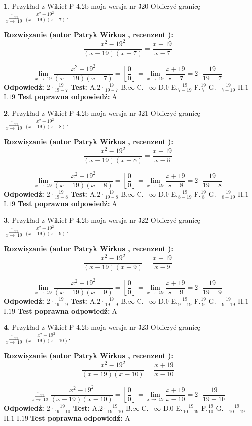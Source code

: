 \documentclass[12pt, a4paper]{article}
\theoremstyle{definition} %
\newtheorem{zad}{}
\newcommand{\zadStart}[1]{\begin{zad}#1\newline}
\newcommand{\zadStop}{\end{zad}}
\newcommand{\rozwStart}[2]{\noindent \textbf{Rozwiązanie (autor #1 , recenzent #2): }\newline}
\newcommand{\rozwStop}{\newline}
\newcommand{\odpStart}{\noindent \textbf{Odpowiedź:}\newline}
\newcommand{\odpStop}{\newline}
\newcommand{\testStart}{\noindent \textbf{Test:}\newline}
\newcommand{\testStop}{\newline}
\newcommand{\kluczStart}{\noindent \textbf{Test poprawna odpowiedź:}\newline}
\newcommand{\kluczStop}{\newline}
\begin{document}
\zadStart{Przykład z Wikieł P 4.2b moja wersja nr 320}
Obliczyć granicę $\lim\limits_{x\to\ 19}\frac{x^{2}-19^{2}}{(x-19)(x-7)}$.
\zadStop
\rozwStart{Patryk Wirkus}{}
$$\frac{x^{2}-19^{2}}{(x-19)(x-7)}=\frac{x+19}{x-7}$$

$$\lim\limits_{x\to\ 19}\frac{x^{2}-19^{2}}{(x-19)(x-7)}=[\frac{0}{0}]=\lim\limits_{x\to\ 19}\frac{x+19}{x-7}=2 \cdot \frac{19}{19-7}$$
\rozwStop
\odpStart
$2 \cdot \frac{19}{19-7}$
\odpStop
\testStart
A.$2 \cdot \frac{19}{19-7}$
B.$\infty$
C.$-\infty$
D.$0$
E.$\frac{19}{7-19}$
F.$\frac{19}{7}$
G.$-\frac{19}{7-19}$
H.$1$
I.$19$
\testStop
\kluczStart
A
\kluczStop



\zadStart{Przykład z Wikieł P 4.2b moja wersja nr 321}
Obliczyć granicę $\lim\limits_{x\to\ 19}\frac{x^{2}-19^{2}}{(x-19)(x-8)}$.
\zadStop
\rozwStart{Patryk Wirkus}{}
$$\frac{x^{2}-19^{2}}{(x-19)(x-8)}=\frac{x+19}{x-8}$$

$$\lim\limits_{x\to\ 19}\frac{x^{2}-19^{2}}{(x-19)(x-8)}=[\frac{0}{0}]=\lim\limits_{x\to\ 19}\frac{x+19}{x-8}=2 \cdot \frac{19}{19-8}$$
\rozwStop
\odpStart
$2 \cdot \frac{19}{19-8}$
\odpStop
\testStart
A.$2 \cdot \frac{19}{19-8}$
B.$\infty$
C.$-\infty$
D.$0$
E.$\frac{19}{8-19}$
F.$\frac{19}{8}$
G.$-\frac{19}{8-19}$
H.$1$
I.$19$
\testStop
\kluczStart
A
\kluczStop



\zadStart{Przykład z Wikieł P 4.2b moja wersja nr 322}
Obliczyć granicę $\lim\limits_{x\to\ 19}\frac{x^{2}-19^{2}}{(x-19)(x-9)}$.
\zadStop
\rozwStart{Patryk Wirkus}{}
$$\frac{x^{2}-19^{2}}{(x-19)(x-9)}=\frac{x+19}{x-9}$$

$$\lim\limits_{x\to\ 19}\frac{x^{2}-19^{2}}{(x-19)(x-9)}=[\frac{0}{0}]=\lim\limits_{x\to\ 19}\frac{x+19}{x-9}=2 \cdot \frac{19}{19-9}$$
\rozwStop
\odpStart
$2 \cdot \frac{19}{19-9}$
\odpStop
\testStart
A.$2 \cdot \frac{19}{19-9}$
B.$\infty$
C.$-\infty$
D.$0$
E.$\frac{19}{9-19}$
F.$\frac{19}{9}$
G.$-\frac{19}{9-19}$
H.$1$
I.$19$
\testStop
\kluczStart
A
\kluczStop



\zadStart{Przykład z Wikieł P 4.2b moja wersja nr 323}
Obliczyć granicę $\lim\limits_{x\to\ 19}\frac{x^{2}-19^{2}}{(x-19)(x-10)}$.
\zadStop
\rozwStart{Patryk Wirkus}{}
$$\frac{x^{2}-19^{2}}{(x-19)(x-10)}=\frac{x+19}{x-10}$$

$$\lim\limits_{x\to\ 19}\frac{x^{2}-19^{2}}{(x-19)(x-10)}=[\frac{0}{0}]=\lim\limits_{x\to\ 19}\frac{x+19}{x-10}=2 \cdot \frac{19}{19-10}$$
\rozwStop
\odpStart
$2 \cdot \frac{19}{19-10}$
\odpStop
\testStart
A.$2 \cdot \frac{19}{19-10}$
B.$\infty$
C.$-\infty$
D.$0$
E.$\frac{19}{10-19}$
F.$\frac{19}{10}$
G.$-\frac{19}{10-19}$
H.$1$
I.$19$
\testStop
\kluczStart
A
\kluczStop
\end{document}
